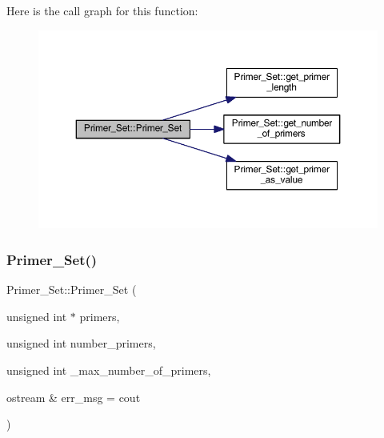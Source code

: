 Here is the call graph for this function\+:
\nopagebreak
\begin{figure}[H]
\begin{center}
\leavevmode
\includegraphics[width=350pt]{class_primer___set_a47c64ebda73f5a9d34d68f3c116c09cf_cgraph}
\end{center}
\end{figure}
\mbox{\label{class_primer___set_ae3c919cd6aa18e8e2c3e4f5d3ea9a37c}} 
\subsubsection{\texorpdfstring{Primer\+\_\+\+Set()}{Primer\_Set()}\hspace{0.1cm}{\footnotesize\ttfamily [4/5]}}
{\footnotesize\ttfamily Primer\+\_\+\+Set\+::\+Primer\+\_\+\+Set (\begin{DoxyParamCaption}\item[{unsigned int $\ast$}]{primers,  }\item[{unsigned int}]{number\+\_\+primers,  }\item[{unsigned int}]{\+\_\+max\+\_\+number\+\_\+of\+\_\+primers,  }\item[{ostream \&}]{err\+\_\+msg = {\ttfamily cout} }\end{DoxyParamCaption})}

\mbox{\label{class_primer___set_aa6e3ae72bc7cd4506b48b09e6591bd0f}} 
